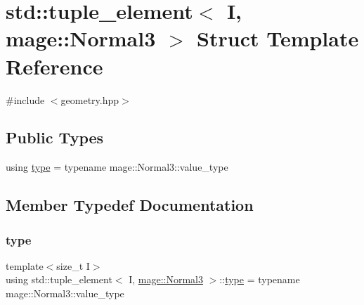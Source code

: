 \hypertarget{structstd_1_1tuple__element_3_01_i_00_01mage_1_1_normal3_01_4}{}\section{std\+:\+:tuple\+\_\+element$<$ I, mage\+:\+:Normal3 $>$ Struct Template Reference}
\label{structstd_1_1tuple__element_3_01_i_00_01mage_1_1_normal3_01_4}


{\ttfamily \#include $<$geometry.\+hpp$>$}

\subsection*{Public Types}
\begin{DoxyCompactItemize}
\item 
using \mbox{\hyperlink{structstd_1_1tuple__element_3_01_i_00_01mage_1_1_normal3_01_4_a02fab6104a3747895b4c028748109c45}{type}} = typename mage\+::\+Normal3\+::value\+\_\+type
\end{DoxyCompactItemize}


\subsection{Member Typedef Documentation}
\mbox{\label{structstd_1_1tuple__element_3_01_i_00_01mage_1_1_normal3_01_4_a02fab6104a3747895b4c028748109c45}} 
\subsubsection{\texorpdfstring{type}{type}}
{\footnotesize\ttfamily template$<$size\+\_\+t I$>$ \\
using std\+::tuple\+\_\+element$<$ I, \mbox{\hyperlink{structmage_1_1_normal3}{mage\+::\+Normal3}} $>$\+::\mbox{\hyperlink{structstd_1_1tuple__element_3_01_i_00_01mage_1_1_normal3_01_4_a02fab6104a3747895b4c028748109c45}{type}} =  typename mage\+::\+Normal3\+::value\+\_\+type}

